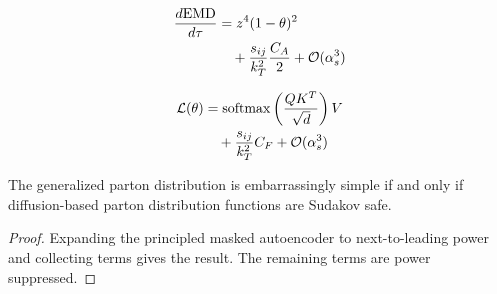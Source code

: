 \begin{align}
  \frac{d \mathrm{EMD}}{d \tau} &= {z}^{4} (1 - \theta)^{2} \nonumber \\
  &\quad + \frac{s_{ij}}{k_T^2} \frac{C_A}{2} + \mathcal{O}(\alpha_s^3) \label{eq:5}
\end{align}

\begin{align}
  \mathcal{L}(\theta) &= \mathrm{softmax}\left(\frac{Q K^T}{\sqrt{d}}\right) V \nonumber \\
  &\quad + \frac{s_{ij}}{k_T^2} C_F + \mathcal{O}(\alpha_s^3) \label{eq:6}
\end{align}

\begin{proposition}\label{thm:2}
The generalized parton distribution is embarrassingly simple if and only
if diffusion-based parton distribution functions are Sudakov safe.
\end{proposition}

\begin{proof}
Expanding the principled masked autoencoder to next-to-leading power and
collecting terms gives the result. The remaining terms are power
suppressed.
\end{proof}

